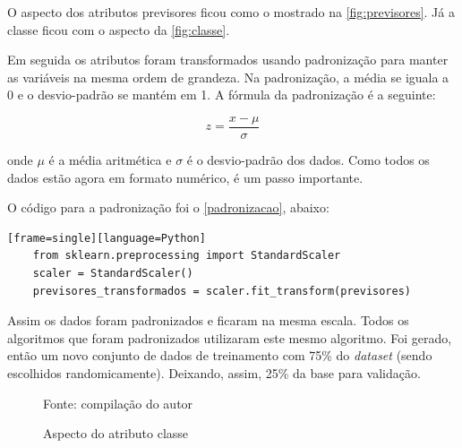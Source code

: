 O aspecto dos atributos previsores ficou como o mostrado na \autoref{fig:previsores}. Já a classe ficou com o aspecto da \autoref{fig:classe}.

Em seguida os atributos foram transformados usando padronização para manter as variáveis na mesma ordem de grandeza. Na padronização, a média se iguala a 0 e o desvio-padrão se mantém em 1. A fórmula da padronização é a seguinte:

\begin{equation}\label{eq:padronizacao}
z = \frac{x - \mu}{\sigma}
\end{equation}

onde $\mu$ é a média aritmética e $\sigma$ é o desvio-padrão dos dados. Como todos os dados estão agora em formato numérico, é um passo importante. 

O código para a padronização foi o \autoref{padronizacao}, abaixo:
\begin{lstlisting}[caption={Código da Padronização},label=padronizacao][frame=single][language=Python]
	from sklearn.preprocessing import StandardScaler
	scaler = StandardScaler()
	previsores_transformados = scaler.fit_transform(previsores)
\end{lstlisting}

Assim os dados foram padronizados e ficaram na mesma escala. Todos os algoritmos que foram padronizados utilizaram este mesmo algoritmo. Foi gerado, então um novo conjunto de dados de treinamento com 75\% do \textit{dataset} (sendo escolhidos randomicamente). Deixando, assim, 25\% da base para validação.

\begin{figure}[H]
	\centering
	\caption{Aspecto do atributo classe}
	
	\label{fig:classe}
	{\scriptsize Fonte: compilação do autor}
\end{figure}

